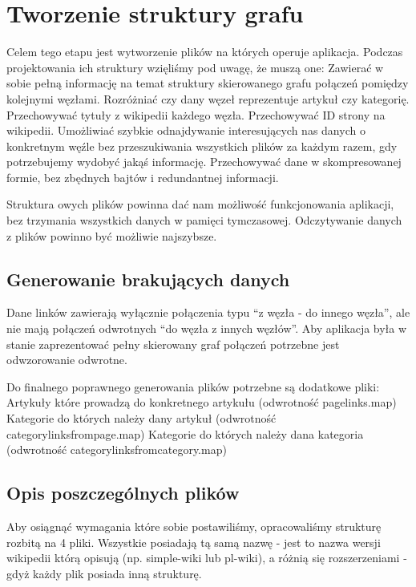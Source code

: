 \section{Tworzenie struktury grafu}
\label{sec:data-files}

Celem tego etapu jest wytworzenie plików na których operuje aplikacja. Podczas projektowania ich struktury wzięliśmy pod uwagę, że muszą one:
Zawierać w sobie pełną informację na temat struktury skierowanego grafu połączeń pomiędzy kolejnymi węzłami.
Rozróżniać czy dany węzeł reprezentuje artykuł czy kategorię.
Przechowywać tytuły z wikipedii każdego węzła.
Przechowywać ID strony na wikipedii.
Umożliwiać szybkie odnajdywanie interesujących nas danych o konkretnym węźle bez przeszukiwania wszystkich plików za każdym razem, gdy potrzebujemy wydobyć jakąś informację.
Przechowywać dane w skompresowanej formie, bez zbędnych bajtów i redundantnej informacji.

Struktura owych plików powinna dać nam możliwość funkcjonowania aplikacji, bez trzymania wszystkich danych w pamięci tymczasowej. Odczytywanie danych z plików powinno być możliwie najszybsze.

\subsection{Generowanie brakujących danych}

Dane linków zawierają wyłącznie połączenia typu “z węzła - do innego węzła”, ale nie mają połączeń odwrotnych “do węzła z innych węzłów”. Aby aplikacja była w stanie zaprezentować pełny skierowany graf połączeń potrzebne jest odwzorowanie odwrotne.

Do finalnego poprawnego generowania plików potrzebne są dodatkowe pliki:
Artykuły które prowadzą do konkretnego artykułu (odwrotność pagelinks.map)
Kategorie do których należy dany artykuł (odwrotność categorylinksfrompage.map)
Kategorie do których należy dana kategoria (odwrotność categorylinksfromcategory.map)



\subsection{Opis poszczególnych plików}
Aby osiągnąć wymagania które sobie postawiliśmy, opracowaliśmy strukturę rozbitą na 4 pliki. Wszystkie posiadają tą samą nazwę - jest to nazwa wersji wikipedii którą opisują (np. simple-wiki lub pl-wiki), a różnią się rozszerzeniami - gdyż każdy plik posiada inną strukturę.

